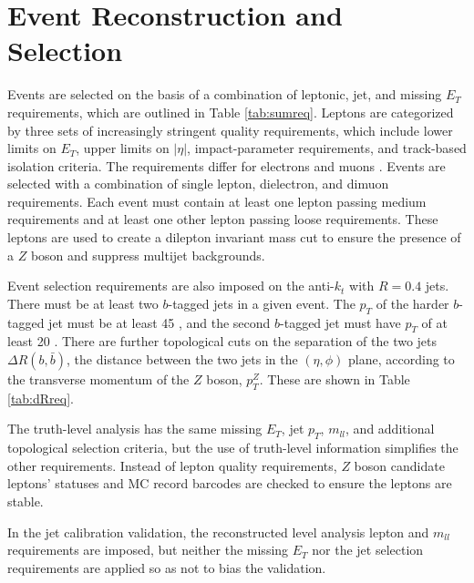 \section{Event Reconstruction and Selection}
\label{sec:evsel}
Events are selected on the basis of a combination of leptonic, jet, and missing $E_T$ requirements, which are outlined in Table \ref{tab:sumreq}.  Leptons are categorized by three sets of increasingly stringent quality requirements, which include lower limits on $E_T$, upper limits on $\left|\eta\right|$, impact-parameter requirements, and track-based isolation criteria.  The requirements differ for electrons \cite{tjconf50} and muons \cite{tjconf51}.  Events are selected with a combination of single lepton, dielectron, and dimuon requirements.  Each event must contain at least one lepton passing medium requirements and at least one other lepton passing loose requirements.  These leptons are used to create a dilepton invariant mass cut to ensure the presence of a $Z$ boson and suppress multijet backgrounds.

Event selection requirements are also imposed on the anti-$k_t$ with $R=0.4$ jets.  There must be at least two $b$-tagged jets in a given event.  The $p_T$ of the harder $b$-tagged jet must be at least 45 \GeV, and the second $b$-tagged jet must have $p_T$ of at least 20 \GeV .  There are further topological cuts on the separation of the two jets $\Delta R\left(b,\bar{b}\right)$, the distance between the two jets in the $\left(\eta,\phi\right)$ plane, according to the transverse momentum of the $Z$ boson, $p_T^Z$.  These are shown in Table \ref{tab:dRreq}.

The truth-level analysis has the same missing $E_T$, jet $p_T$, $m_{ll}$, and additional topological selection criteria, but the use of truth-level information simplifies the other requirements.  Instead of lepton quality requirements, $Z$ boson candidate leptons' statuses and MC record barcodes are checked to ensure the leptons are stable.

In the jet calibration validation, the reconstructed level analysis lepton and $m_{ll}$ requirements are imposed, but neither the missing $E_T$ nor the jet selection requirements are applied so as not to bias the validation.

